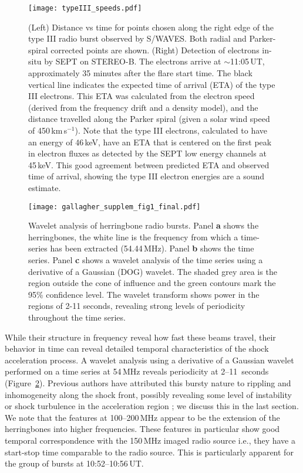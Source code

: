 \begin{figure}[!t]
\begin{center}
\texttt{[image: typeIII\_speeds.pdf]}
\caption[Type III speeds]{(Left) Distance vs time for points chosen along the right edge of the type III radio burst observed by S/WAVES. Both radial and Parker-spiral corrected points are shown. (Right) Detection of electrons in-situ by SEPT on STEREO-B. The electrons arrive at $\sim$11:05\,UT, approximately 35 minutes after the flare start time. The black vertical line indicates the expected time of arrival (ETA) of the type III electrons. This ETA was calculated from the electron speed (derived from the frequency drift and a density model), and the distance travelled along the Parker spiral (given a solar wind speed of 450\,km\,s$^{-1}$). Note that the type III electrons, calculated to have an energy of 46\,keV, have an ETA that is centered on the first peak in electron fluxes as detected by the SEPT low energy channels at 45\,keV. This good agreement between predicted ETA and observed time of arrival, showing the type III electron energies are a sound estimate.}
\label{fig:typeIII_speeds}
\end{center}
\end{figure}


\begin{figure}[!t]
\begin{center}
\texttt{[image: gallagher\_supplem\_fig1\_final.pdf]}
\caption[Herringbone wavelet analysis]{Wavelet analysis of herringbone radio bursts. Panel {\bf a} shows the herringbones, the white line is the frequency from which a time-series has been extracted (54.44\,MHz). Panel {\bf b} shows the time series. Panel {\bf c} shows a wavelet analysis of the time series using a derivative of a Gaussian (DOG) wavelet. The shaded grey area is the region outside the cone of influence and the green contours mark the 95\% confidence level. The wavelet transform shows power in the regions of 2-11 seconds, revealing strong levels of periodicity throughout the time series.}
\label{fig:wavelet}
\end{center}
\end{figure}

While their structure in frequency reveal how fast these beams travel, their behavior in time can reveal detailed temporal characteristics of the shock acceleration process.
A wavelet analysis using a derivative of a Gaussian wavelet performed on a time series at 54\,MHz reveals periodicity at 2--11~seconds (Figure~\ref{fig:wavelet}). Previous authors have attributed this bursty nature to rippling and inhomogeneity along the shock front, possibly revealing some level of instability or shock turbulence in the acceleration region \citep{burgess2006, guo2010}; we discuss this in the last section. We note that the features at 100--200\,MHz appear to be the extension of the herringbones into higher frequencies. These features in particular show good temporal correspondence with the 150\,MHz imaged radio source i.e., they have a start-stop time comparable to the radio source. This is particularly apparent for the group of bursts at 10:52--10:56\,UT.

